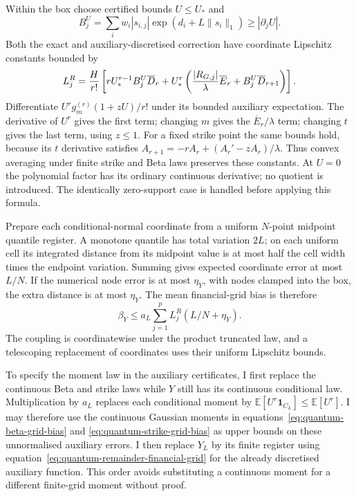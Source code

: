 Within the box choose certified bounds $U\leq U_*$ and
\[
 B_j^U=\sum_iw_i|s_{i,j}|
          \exp(d_i+L\|s_i\|_1)\geq|\partial_j U|.
\]
Both the exact and auxiliary-discretised correction have coordinate
Lipschitz constants bounded by
\begin{equation}
 L_j^R={H\over r!}\left[
 rU_*^{r-1}B_j^U\overline D_r+
 U_*^r\left({|R_{G,j}|\over\lambda}\overline E_r+
                              B_j^U\overline D_{r+1}\right)\right].
 \label{eq:quantum-remainder-grid-slope}
\end{equation}
Differentiate $U^r g_m^{(r)}(1+zU)/r!$ under its bounded auxiliary
expectation. The derivative of $U^r$ gives the first term; changing $m$
gives the $\overline E_r/\lambda$ term; changing $t$ gives the last term,
using $z\leq1$. For a fixed strike point the same bounds hold, because
its $t$ derivative satisfies
$A_{r+1}= -rA_r+(A_r'-zA_r)/\lambda$.
Thus convex averaging under finite strike and Beta laws preserves these
constants. At $U=0$ the polynomial factor has its ordinary continuous
derivative; no quotient is introduced. The identically zero-support case
is handled before applying this formula.

Prepare each conditional-normal coordinate from a uniform $N$-point
midpoint quantile register. A monotone quantile has total variation $2L$;
on each uniform cell its integrated distance from its midpoint value is
at most half the cell width times the endpoint variation. Summing gives
expected coordinate error at most $L/N$. If the numerical node error is
at most $\eta_Y$, with nodes clamped into the box, the extra distance is
at most $\eta_Y$. The mean financial-grid bias is therefore
\begin{equation}
 \beta_Y\leq a_L\sum_{j=1}^p L_j^R(L/N+\eta_Y).
 \label{eq:quantum-remainder-financial-grid}
\end{equation}
The coupling is coordinatewise under the product truncated law, and a
telescoping replacement of coordinates uses their uniform Lipschitz bounds.

To specify the moment law in the auxiliary certificates, I first replace
the continuous Beta and strike laws while $Y$ still has its continuous
conditional law. Multiplication by $a_L$ replaces each conditional moment
by $\mathbb E[U^r\mathbf1_{C_L}]\leq\mathbb E[U^r]$.
I may therefore use the continuous Gaussian moments in
equations~\eqref{eq:quantum-beta-grid-bias} and
\eqref{eq:quantum-strike-grid-bias} as upper bounds on these unnormalised
auxiliary errors. I then replace $Y_L$ by its finite register using
equation~\eqref{eq:quantum-remainder-financial-grid} for the
already discretised auxiliary function. This order avoids substituting
a continuous moment for a different finite-grid moment without proof.

